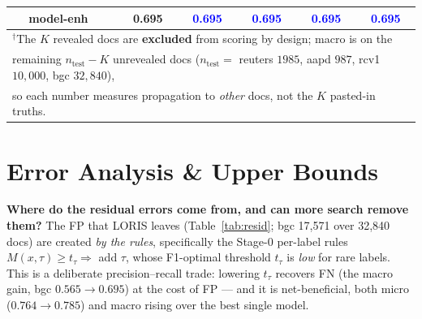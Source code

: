 \documentclass[11pt]{article}
\newcommand{\bld}[1]{\textbf{#1}}\newcommand{\gn}[1]{\textcolor{blue}{#1}}
\begin{document}
\begin{table}[h]
\begin{tabular}{llccccc}
 & \bld{model-enh} & 0.695 & \gn{0.695} & \gn{0.695} & \gn{0.695} & \gn{0.695} \\
\bottomrule
\multicolumn{7}{l}{\footnotesize $^{\dagger}$The $K$ revealed docs are \textbf{excluded} from scoring by design; macro is on the}\\
\multicolumn{7}{l}{\footnotesize remaining $n_{\text{test}}{-}K$ unrevealed docs ($n_{\text{test}}{=}$ reuters $1985$, aapd $987$, rcv1 $10{,}000$, bgc $32{,}840$),}\\
\multicolumn{7}{l}{\footnotesize so each number measures propagation to \emph{other} docs, not the $K$ pasted-in truths.}\\
\end{tabular}
\end{table}
\section{Error Analysis \& Upper Bounds}
\label{sec:err}
\textbf{Where do the residual errors come from, and can more search remove them?} The FP that LORIS leaves
(Table~\ref{tab:resid}; bgc 17{,}571 over 32{,}840 docs) are created \emph{by the rules}, specifically the
Stage-0 per-label rules $M(x,\tau)\!\ge\!t_\tau\Rightarrow$ add $\tau$, whose F1-optimal threshold $t_\tau$
is \emph{low} for rare labels. This is a deliberate precision--recall trade: lowering $t_\tau$ recovers FN
(the macro gain, bgc $0.565\!\to\!0.695$) at the cost of FP --- and it is net-beneficial, both micro
($0.764\!\to\!0.785$) and macro rising over the best single model.
\end{document}
